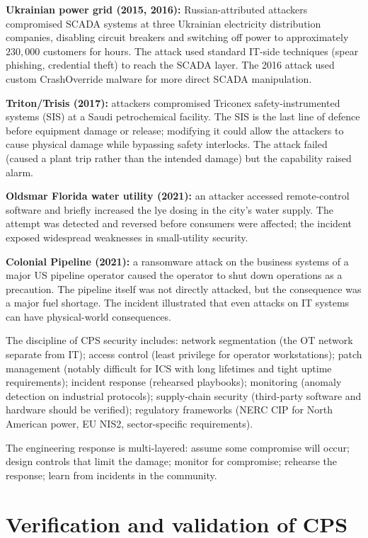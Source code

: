 \textbf{Ukrainian power grid (2015, 2016):} Russian-attributed attackers compromised SCADA systems at three Ukrainian electricity distribution companies, disabling circuit breakers and switching off power to approximately $230{,}000$ customers for hours. The attack used standard IT-side techniques (spear phishing, credential theft) to reach the SCADA layer. The 2016 attack used custom CrashOverride malware for more direct SCADA manipulation.

\textbf{Triton/Trisis (2017):} attackers compromised Triconex safety-instrumented systems (SIS) at a Saudi petrochemical facility. The SIS is the last line of defence before equipment damage or release; modifying it could allow the attackers to cause physical damage while bypassing safety interlocks. The attack failed (caused a plant trip rather than the intended damage) but the capability raised alarm.

\textbf{Oldsmar Florida water utility (2021):} an attacker accessed remote-control software and briefly increased the lye dosing in the city's water supply. The attempt was detected and reversed before consumers were affected; the incident exposed widespread weaknesses in small-utility security.

\textbf{Colonial Pipeline (2021):} a ransomware attack on the business systems of a major US pipeline operator caused the operator to shut down operations as a precaution. The pipeline itself was not directly attacked, but the consequence was a major fuel shortage. The incident illustrated that even attacks on IT systems can have physical-world consequences.

The discipline of CPS security includes: network segmentation (the OT network separate from IT); access control (least privilege for operator workstations); patch management (notably difficult for ICS with long lifetimes and tight uptime requirements); incident response (rehearsed playbooks); monitoring (anomaly detection on industrial protocols); supply-chain security (third-party software and hardware should be verified); regulatory frameworks (NERC CIP for North American power, EU NIS2, sector-specific requirements).

The engineering response is multi-layered: assume some compromise will occur; design controls that limit the damage; monitor for compromise; rehearse the response; learn from incidents in the community.

\section{Verification and validation of CPS}

